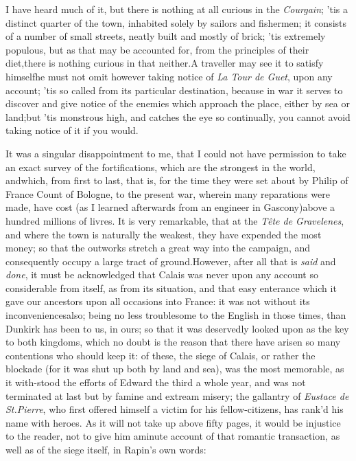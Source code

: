 \documentclass{article}
\begin{document}
I have heard much of it, but there is nothing at all curious in
the \textit{Courgain}; ’tis a distinct quarter of the town,
inhabited solely by sailors and fishermen; it consists of a number
of small streets, neatly built and mostly of brick; ’tis\pb
extremely populous, but as that may be accounted for, from the
principles of their diet,\tsk there is nothing curious in that
neither.\tsh A traveller may see it to satisfy
himself\tsk he must not omit however taking notice of \textit{La Tour de Guet}, upon
any account; ’tis so called from its particular destination,
because in war it serves to discover and give notice of the enemies
which approach the place, either by sea or land;\tsh but
’tis monstrous high, and catches the eye so continually, you
cannot avoid taking notice of it if you would.

It was a singular disappointment to me, that I could not have
permission to take an exact survey of the fortifications, which are
the strongest in the world, and\pb which, from first to last, that is,
for the time they were set about by Philip of France
Count of Bologne, to the present war, wherein many
reparations were made, have cost (as I learned afterwards from an
engineer in Gascony)\tsk above a hundred millions of
livres. It is very remarkable, that at the \textit{Tête de
Gravelenes}, and where the town is naturally the weakest, they
have expended the most money; so that the outworks stretch a great
way into the campaign, and consequently occupy a large tract of
ground.\break\tsk However, after all that is \textit{said} and
\textit{done}, it must be acknowledged that Calais was never
upon any account so considerable from itself, as from its
situation, and that easy enterance which it gave our ancestors upon
all occasions into France: it was not without its
inconveniences\pb also; being no less troublesome to the
English in those times, than Dunkirk has been to us,
in ours; so that it was deservedly looked upon as the key to both
kingdoms, which no doubt is the reason that there have arisen so
many contentions who should keep it: of these, the siege of
Calais, or rather the blockade (for it was shut up both by
land and sea), was the most memorable, as it with-stood the efforts
of Edward the third a whole year, and was not terminated at
last but by famine and extream misery; the gallantry of \textit{Eustace
de St.\@ Pierre}, who first offered himself a victim for his
fellow-citizens, has rank’d his name with heroes. As it will
not take up above fifty pages, it would be injustice to the reader,
not to give him a\pb minute account of that romantic transaction, as well
as of the siege itself, in Rapin’s own words:
\end{document}
